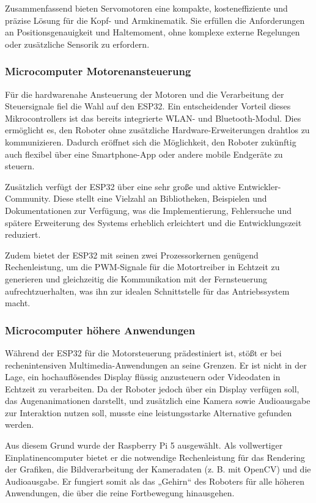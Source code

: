 Zusammenfassend bieten Servomotoren eine kompakte, kosteneffiziente und präzise Lösung für die Kopf- und Armkinematik. Sie erfüllen die Anforderungen an Positionsgenauigkeit und Haltemoment, ohne komplexe externe Regelungen oder zusätzliche Sensorik zu erfordern.  


\subsubsection{Microcomputer Motorenansteuerung}
Für die hardwarenahe Ansteuerung der Motoren und die Verarbeitung der Steuersignale fiel die Wahl auf den ESP32. Ein entscheidender Vorteil dieses Mikrocontrollers ist das bereits integrierte WLAN- und Bluetooth-Modul. Dies ermöglicht es, den Roboter ohne zusätzliche Hardware-Erweiterungen drahtlos zu kommunizieren. Dadurch eröffnet sich die Möglichkeit, den Roboter zukünftig auch flexibel über eine Smartphone-App oder andere mobile Endgeräte zu steuern.

Zusätzlich verfügt der ESP32 über eine sehr große und aktive Entwickler-Community. Diese stellt eine Vielzahl an Bibliotheken, Beispielen und Dokumentationen zur Verfügung, was die Implementierung, Fehlersuche und spätere Erweiterung des Systems erheblich erleichtert und die Entwicklungszeit reduziert.

Zudem bietet der ESP32 mit seinen zwei Prozessorkernen genügend Rechenleistung, um die PWM-Signale für die Motortreiber in Echtzeit zu generieren und gleichzeitig die Kommunikation mit der Fernsteuerung aufrechtzuerhalten, was ihn zur idealen Schnittstelle für das Antriebssystem macht.

\subsubsection{Microcomputer höhere Anwendungen} %

Während der ESP32 für die Motorsteuerung prädestiniert ist, stößt er bei rechenintensiven Multimedia-Anwendungen an seine Grenzen. Er ist nicht in der Lage, ein hochauflösendes Display flüssig anzusteuern oder Videodaten in Echtzeit zu verarbeiten. Da der Roboter jedoch über ein Display verfügen soll, das Augenanimationen darstellt, und zusätzlich eine Kamera sowie Audioausgabe zur Interaktion nutzen soll, musste eine leistungsstarke Alternative gefunden werden.

Aus diesem Grund wurde der Raspberry Pi 5 ausgewählt. Als vollwertiger Einplatinencomputer bietet er die notwendige Rechenleistung für das Rendering der Grafiken, die Bildverarbeitung der Kameradaten (z. B. mit OpenCV) und die Audioausgabe. Er fungiert somit als das „Gehirn“ des Roboters für alle höheren Anwendungen, die über die reine Fortbewegung hinausgehen.

